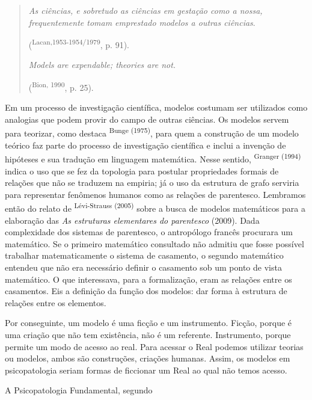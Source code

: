 \begin{multicols}{2}
\begin{quote}\par{}\textit{As ciências,\allowbreak{} e sobretudo as ciências em gestação como a nossa,\allowbreak{} frequentemente tomam emprestado modelos a outras ciências}.\allowbreak{}\par{}(\allowbreak{}\textsuperscript{Lacan,\allowbreak{}1953-\allowbreak{}1954\fshyp{}1979},\allowbreak{} p.\allowbreak{} 91)\allowbreak{}.\allowbreak{}\par{}\textit{Models are expendable; theories are not.\allowbreak{} }\par{}(\allowbreak{}\textsuperscript{Bion,\allowbreak{} 1990},\allowbreak{} p.\allowbreak{} 25)\allowbreak{}.\allowbreak{}\end{quote}\par{}Em um processo de investigação científica,\allowbreak{} modelos costumam ser utilizados como analogias que podem provir do campo de outras ciências.\allowbreak{} Os modelos servem para teorizar,\allowbreak{} como destaca \textsuperscript{Bunge (\allowbreak{}1975)\allowbreak{}},\allowbreak{} para quem a construção de um modelo teórico faz parte do processo de investigação científica e inclui a invenção de hipóteses e sua tradução em linguagem matemática.\allowbreak{} Nesse sentido,\allowbreak{} \textsuperscript{Granger (\allowbreak{}1994)\allowbreak{}} indica o uso que se fez da topologia para postular propriedades formais de relações que não se traduzem na empiria; já o uso da estrutura de grafo serviria para representar fenômenos humanos como as relações de parentesco.\allowbreak{} Lembramos então do relato de \textsuperscript{Lévi-\allowbreak{}Strauss (\allowbreak{}2005)\allowbreak{}} sobre a busca de modelos matemáticos para a elaboração das \textit{As estruturas elementares do parentesco} (\allowbreak{}2009)\allowbreak{}.\allowbreak{} Dada complexidade dos sistemas de parentesco,\allowbreak{} o antropólogo francês procurara um matemático.\allowbreak{} Se o primeiro matemático consultado não admitiu que fosse possível trabalhar matematicamente o sistema de casamento,\allowbreak{} o segundo matemático entendeu que não era necessário definir o casamento sob um ponto de vista matemático.\allowbreak{} O que interessava,\allowbreak{} para a formalização,\allowbreak{} eram as relações entre os casamentos.\allowbreak{} Eis a definição da função dos modelos:\allowbreak{} dar forma à estrutura de relações entre os elementos.\allowbreak{}\par{}Por conseguinte,\allowbreak{} um modelo é uma ficção e um instrumento.\allowbreak{} Ficção,\allowbreak{} porque é uma criação que não tem existência,\allowbreak{} não é um referente.\allowbreak{} Instrumento,\allowbreak{} porque permite um modo de acesso ao real.\allowbreak{} Para acessar o Real podemos utilizar teorias ou modelos,\allowbreak{} ambos são construções,\allowbreak{} criações humanas.\allowbreak{} Assim,\allowbreak{} os modelos em psicopatologia seriam formas de ficcionar um Real ao qual não temos acesso.\allowbreak{}\par{}A Psicopatologia Fundamental,\allowbreak{} segundo 
\end{multicols}
